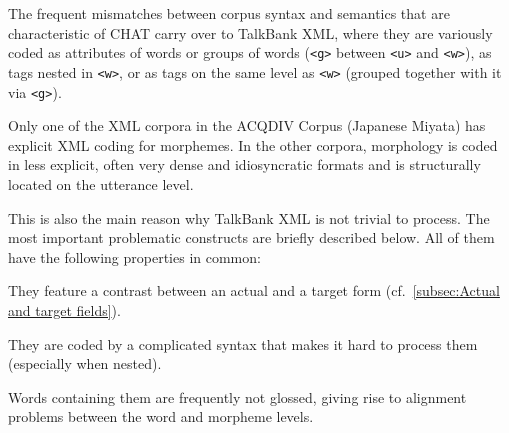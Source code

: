 \documentclass[a4paper, 11pt]{book}
\begin{document}
The frequent mismatches between corpus syntax and semantics that are characteristic of CHAT carry over to TalkBank XML, where they are variously coded as attributes of words or groups of words (\texttt{<g>} between \texttt{<u>} and \texttt{<w>}), as tags nested in \texttt{<w>}, or as tags on the same level as \texttt{<w>} (grouped together with it via \texttt{<g>}).

Only one of the XML corpora in the ACQDIV Corpus (Japanese Miyata) has explicit XML coding for morphemes. In the other corpora, morphology is coded in less explicit, often very dense and idiosyncratic formats and is structurally located on the utterance level.


%
%
%
%
%

This is also the main reason why TalkBank XML is not trivial to process. The most important problematic constructs are briefly described below. All of them have the following properties in common:

\begin{itemize*}
	\item They feature a contrast between an actual and a target form (cf.\ \autoref{subsec:Actual and target fields}).
	\item They are coded by a complicated syntax that makes it hard to process them (especially when nested).
	\item Words containing them are frequently not glossed, giving rise to alignment problems between the word and morpheme levels.
\end{itemize*}
\end{document}
